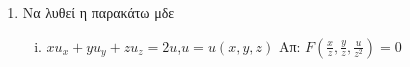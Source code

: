 \begin{enumerate}
\item Να λυθεί η παρακάτω μδε
\begin{enumerate}[i)]
  \item $xu_{x}+yu_{y}+zu_{z}=2u$,\quad $u=u(x,y,z)$ \hfill Απ: $F(\frac{x}{z},\frac{y}{z},\frac{u}{z^{2}})=0$

\end{enumerate}
\end{enumerate}


